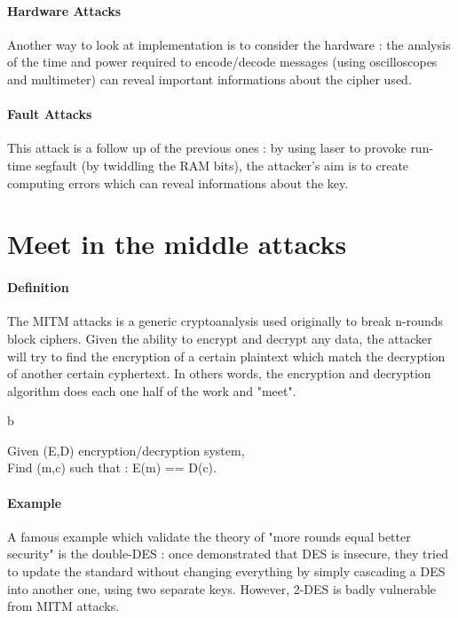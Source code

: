\paragraph{Hardware Attacks \\}
Another way to look at implementation is to consider the hardware : the analysis of the time and power required to encode/decode messages (using oscilloscopes and multimeter) can reveal important informations about the cipher used.

\paragraph{Fault Attacks \\}
This attack is a follow up of the previous ones : by using laser to provoke run-time segfault (by twiddling the RAM bits), the attacker's aim is to create computing errors which can reveal informations about the key.

\section{Meet in the middle attacks}

\paragraph{Definition\\}
The MITM attacks is a generic cryptoanalysis used originally to break n-rounds block ciphers. Given the ability to encrypt and decrypt any data, the attacker will try to find the encryption of a certain plaintext which match the decryption of another certain cyphertext. In others words, the encryption and decryption algorithm does each one half of the work and "meet".

\begin{mydef}
b \newline
\begin{minipage}[t]{0.8\textwidth}
	Given (E,D) encryption/decryption system, \\
    Find (m,c) such that : E(m) == D(c).
\end{minipage}
\end{mydef}

\paragraph{Example}

A famous example which validate the theory of "more rounds equal better security" is the double-DES : once demonstrated that DES is insecure, they tried to update the standard without changing everything by simply cascading a DES into another one, using two separate keys. However, 2-DES is badly vulnerable from MITM attacks.

